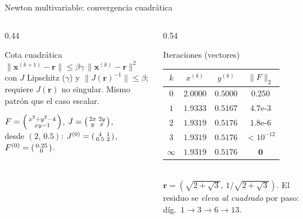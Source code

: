 \documentclass[aspectratio=169,10pt]{beamer}
\begin{document}
\begin{frame}{Newton multivariable: convergencia cuadrática}
\begin{columns}[T]
\begin{column}{0.44\textwidth}
\begin{cardidea}{Cota cuadrática}{\faSuperscript}
{\footnotesize $\|\mathbf x^{(k+1)}-\mathbf r\|\le \beta\gamma\,\|\mathbf x^{(k)}-\mathbf r\|^2$\\[1.2mm]
con $J$ Lipschitz ($\gamma$) y $\|J(\mathbf r)^{-1}\|\le\beta$; requiere $J(\mathbf r)$ no singular. Mismo patrón que el caso escalar.}
\end{cardidea}
\vspace{1mm}
\begin{cardnota}[\faListOl]
{\footnotesize $F=\begin{psmallmatrix}x^2+y^2-4\\ xy-1\end{psmallmatrix}$, $J=\begin{psmallmatrix}2x&2y\\ y&x\end{psmallmatrix}$,\\[0.6mm]
desde $(2,\,0.5)$: $J^{(0)}=\begin{psmallmatrix}4&1\\ 0.5&2\end{psmallmatrix}$, $F^{(0)}=\begin{psmallmatrix}0.25\\ 0\end{psmallmatrix}$.}
\end{cardnota}
\end{column}
\begin{column}{0.54\textwidth}
\begin{cardgear}{Iteraciones (vectores)}{\faTable}
\centering
{\footnotesize\renewcommand{\arraystretch}{1.25}\setlength{\tabcolsep}{6pt}
\begin{tabular}{c|ccc}
$k$ & $x^{(k)}$ & $y^{(k)}$ & $\|F\|_2$\\\hline
$0$&$2.0000$&$0.5000$&$0.250$\\
$1$&$1.9333$&$0.5167$&$4.7\text{e-}3$\\
$2$&$1.9319$&$0.5176$&$1.8\text{e-}6$\\
$3$&$1.9319$&$0.5176$&$<10^{-12}$\\
$\infty$&$\mathbf{1.9319}$&$\mathbf{0.5176}$&$\mathbf 0$\\
\end{tabular}}\\[1mm]
{\footnotesize $\mathbf r=(\sqrt{2+\sqrt3},\,1/\!\sqrt{2+\sqrt3})$. El residuo se \emph{eleva al cuadrado} por paso: díg.\ $1{\to}3{\to}6{\to}13$.}
\end{cardgear}
\end{column}
\end{columns}
\end{frame}
\end{document}
